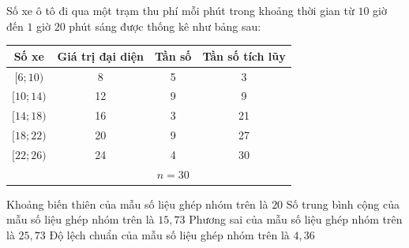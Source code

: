 \begin{ex}
	Số xe ô tô đi qua một trạm thu phí mỗi phút trong khoảng thời gian từ $10$ giờ đến $1$ giờ $20$ phút sáng được thống kê như bảng sau:
	\begin{center}
		\begin{tabular}{|c|c|c|c|}
			\hline Số xe & Giá trị đại diện & Tần số & Tần số tích lũy \\
			\hline$[6 ; 10)$ & 8 & 5 & 3 \\
			\hline$[10 ; 14)$ & 12 & 9 & 9 \\
			\hline$[14 ; 18)$ & 16 & 3 & 21 \\
			\hline$[18 ; 22)$ & 20 & 9 & 27 \\
			\hline$[22 ; 26)$ & 24 & 4 & 30 \\
			\hline & & $n=30$ & \\
			\hline	
		\end{tabular}
	\end{center}
	\choiceTF
	{\True Khoảng biến thiên của mẫu số liệu ghép nhóm trên là $20$}
	{\True Số trung bình cộng của mẫu số liệu ghép nhóm trên là $15{,}73$}
	{Phương sai của mẫu số liệu ghép nhóm trên là $25{,}73$}
	{Độ lệch chuẩn của mẫu số liệu ghép nhóm trên là $4{,}36$}
\end{ex}

